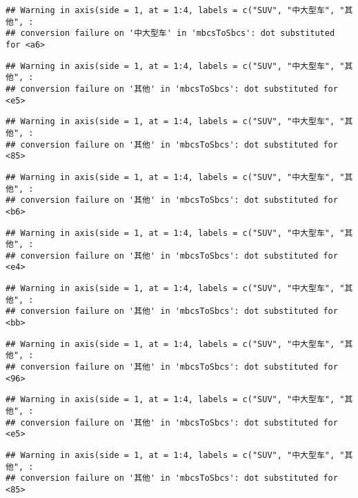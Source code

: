 \documentclass[]{article}
\begin{document}
\begin{verbatim}
## Warning in axis(side = 1, at = 1:4, labels = c("SUV", "中大型车", "其他", :
## conversion failure on '中大型车' in 'mbcsToSbcs': dot substituted for <a6>
\end{verbatim}

\begin{verbatim}
## Warning in axis(side = 1, at = 1:4, labels = c("SUV", "中大型车", "其他", :
## conversion failure on '其他' in 'mbcsToSbcs': dot substituted for <e5>
\end{verbatim}

\begin{verbatim}
## Warning in axis(side = 1, at = 1:4, labels = c("SUV", "中大型车", "其他", :
## conversion failure on '其他' in 'mbcsToSbcs': dot substituted for <85>
\end{verbatim}

\begin{verbatim}
## Warning in axis(side = 1, at = 1:4, labels = c("SUV", "中大型车", "其他", :
## conversion failure on '其他' in 'mbcsToSbcs': dot substituted for <b6>
\end{verbatim}

\begin{verbatim}
## Warning in axis(side = 1, at = 1:4, labels = c("SUV", "中大型车", "其他", :
## conversion failure on '其他' in 'mbcsToSbcs': dot substituted for <e4>
\end{verbatim}

\begin{verbatim}
## Warning in axis(side = 1, at = 1:4, labels = c("SUV", "中大型车", "其他", :
## conversion failure on '其他' in 'mbcsToSbcs': dot substituted for <bb>
\end{verbatim}

\begin{verbatim}
## Warning in axis(side = 1, at = 1:4, labels = c("SUV", "中大型车", "其他", :
## conversion failure on '其他' in 'mbcsToSbcs': dot substituted for <96>
\end{verbatim}

\begin{verbatim}
## Warning in axis(side = 1, at = 1:4, labels = c("SUV", "中大型车", "其他", :
## conversion failure on '其他' in 'mbcsToSbcs': dot substituted for <e5>
\end{verbatim}

\begin{verbatim}
## Warning in axis(side = 1, at = 1:4, labels = c("SUV", "中大型车", "其他", :
## conversion failure on '其他' in 'mbcsToSbcs': dot substituted for <85>
\end{verbatim}
\end{document}
